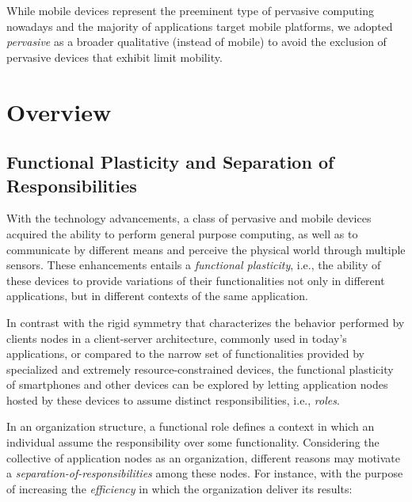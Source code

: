 While mobile devices represent the preeminent type of pervasive computing nowadays and the majority of applications target mobile platforms, we adopted \textit{pervasive} as a broader qualitative (instead of mobile) to avoid the exclusion of pervasive devices that exhibit limit mobility. 

\section{Overview}\label{sec:mobile_applications}

\subsection{Functional Plasticity and Separation of Responsibilities}


With the technology advancements, a class of pervasive and mobile devices acquired the ability to perform general purpose computing, as well as to communicate by different means and perceive the physical world through multiple sensors. These enhancements entails a \textit{functional plasticity}, i.e., the ability of these devices to provide variations of their functionalities not only in different applications, but in different contexts of the same application. 

In contrast with the rigid symmetry that characterizes the behavior performed by clients nodes in a client-server architecture, commonly used in today's applications, or compared to the narrow set of functionalities provided by specialized and extremely resource-constrained devices, the functional plasticity of smartphones and other devices can be explored by letting application nodes hosted by these devices to assume distinct responsibilities, i.e., \textit{roles}.

In an organization structure, a functional role defines a context in which an individual assume the responsibility over some functionality. 
Considering the collective of application nodes as an organization, different reasons may motivate a \textit{separation-of-responsibilities} among these nodes. 
For instance, with the purpose of increasing the \textit{efficiency} in which the organization deliver its results:


